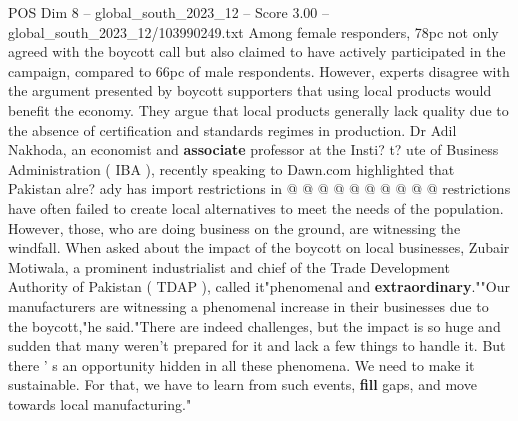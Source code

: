 \begin{textsample}{POS Dim 8 – global\_south\_2023\_12 – Score 3.00 – global\_south\_2023\_12/103990249.txt}
Among female responders, 78pc not only agreed with the boycott call but also claimed to have actively participated in the campaign, compared to 66pc of male respondents.
However, experts disagree with the argument presented by boycott supporters that using local products would benefit the economy.
They argue that local products generally lack quality due to the absence of certification and standards regimes in production.
Dr Adil Nakhoda, an economist and \textbf{associate} professor at the Insti? t? ute of Business Administration ( IBA ), recently speaking to Dawn.com highlighted that Pakistan alre? ady has import restrictions in @ @ @ @ @ @ @ @ @ @ restrictions have often failed to create local alternatives to meet the needs of the population.
However, those, who are doing business on the ground, are witnessing the windfall.
When asked about the impact of the boycott on local businesses, Zubair Motiwala, a prominent industrialist and chief of the Trade Development Authority of Pakistan ( TDAP ), called it"phenomenal and \textbf{extraordinary}.""Our manufacturers are witnessing a phenomenal increase in their businesses due to the boycott,"he said."There are indeed challenges, but the impact is so huge and sudden that many weren't prepared for it and lack a few things to handle it.
But there ' s an opportunity hidden in all these phenomena.
We need to make it sustainable.
For that, we have to learn from such events, \textbf{fill} gaps, and move towards local manufacturing."

\end{textsample}
